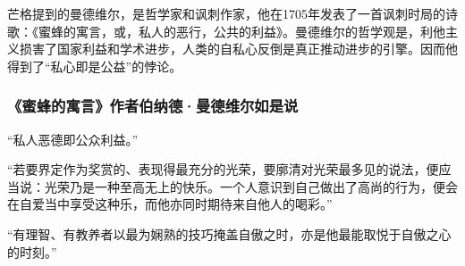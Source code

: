 芒格提到的曼德维尔，是哲学家和讽刺作家，他在1705年发表了一首讽刺时局的诗歌：《蜜蜂的寓言，或，私人的恶行，公共的利益》。曼德维尔的哲学观是，利他主义损害了国家利益和学术进步，人类的自私心反倒是真正推动进步的引擎。因而他得到了“私心即是公益”的悖论。
\par

\subsubsection*{《蜜蜂的寓言》作者伯纳德·曼德维尔如是说}

“私人恶德即公众利益。”
\par

“若要界定作为奖赏的、表现得最充分的光荣，要廓清对光荣最多见的说法，便应当说：光荣乃是一种至高无上的快乐。一个人意识到自己做出了高尚的行为，便会在自爱当中享受这种乐，而他亦同时期待来自他人的喝彩。”
\par

“有理智、有教养者以最为娴熟的技巧掩盖自傲之时，亦是他最能取悦于自傲之心的时刻。”
\par
